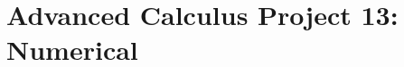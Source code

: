\documentclass
[justified,nohyper]
{tufte-handout}
\begin{document}
\section{Advanced Calculus Project 13: Numerical}

\end{document}

